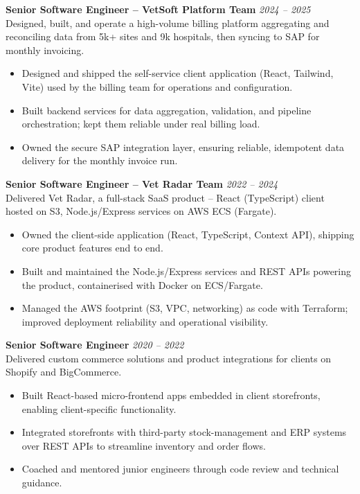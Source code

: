 \documentclass{resume}
\begin{document}
\vspace{1em}

\textbf{Senior Software Engineer -- VetSoft Platform Team} \hfill \textit{2024 -- 2025} \\
Designed, built, and operate a high-volume billing platform aggregating and reconciling data from 5k+ sites and 9k hospitals, then syncing to SAP for monthly invoicing.
\begin{itemize}
  \item Designed and shipped the self-service client application (React, Tailwind, Vite) used by the billing team for operations and configuration.
  \item Built backend services for data aggregation, validation, and pipeline orchestration; kept them reliable under real billing load.
  \item Owned the secure SAP integration layer, ensuring reliable, idempotent data delivery for the monthly invoice run.
\end{itemize}

\vspace{1em}

\textbf{Senior Software Engineer -- Vet Radar Team} \hfill \textit{2022 -- 2024} \\
Delivered Vet Radar, a full-stack SaaS product -- React (TypeScript) client hosted on S3, Node.js/Express services on AWS ECS (Fargate).
\begin{itemize}
  \item Owned the client-side application (React, TypeScript, Context API), shipping core product features end to end.
  \item Built and maintained the Node.js/Express services and REST APIs powering the product, containerised with Docker on ECS/Fargate.
  \item Managed the AWS footprint (S3, VPC, networking) as code with Terraform; improved deployment reliability and operational visibility.
\end{itemize}

\vspace{1em}

\vspace{1em}
\textbf{Senior Software Engineer} \hfill \textit{2020 -- 2022} \\
Delivered custom commerce solutions and product integrations for clients on Shopify and BigCommerce.
\begin{itemize}
  \item Built React-based micro-frontend apps embedded in client storefronts, enabling client-specific functionality.
  \item Integrated storefronts with third-party stock-management and ERP systems over REST APIs to streamline inventory and order flows.
  \item Coached and mentored junior engineers through code review and technical guidance.
\end{itemize}
\end{document}

